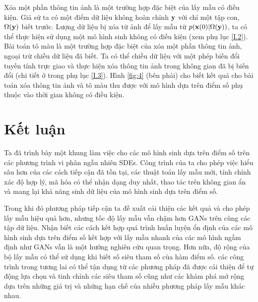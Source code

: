\documentclass{article} %
\begin{document}
Xóa một phần thông tin ảnh là một trường hợp đặc biệt của lấy mẫu có điều kiện.
Giả sử ta có một điểm dữ liệu không hoàn chỉnh $\bold{y}$ với chỉ một tập con, $\Omega(\bold{y})$ biết trước.
Lượng dữ liệu bị xóa từ ảnh để lấy mẫu từ $p(\bold{x}(0) \vert \Omega(\bold{y}))$, ta có thể thực hiện sử dụng một mô hình sinh không có điều kiện (xem phụ lục \ref{I.2}).
Bài toán tô màu là một trường hợp đặc biệt của xóa một phần thông tin ảnh, ngoại trừ chiều dữ liệu đã biết.
Ta có thể chiều dữ liệu với một phép biến đổi tuyến tính trực giao và thực hiện xóa thông tin ảnh trong không gian đã bị biến đổi (chi tiết ở trong phụ lục \ref{I.3}).
Hình \ref{fig:4} (bên phải) cho biết kết quả cho bài toán xóa thông tin ảnh và tô màu thu được với mô hình dựa trên điểm số phụ thuộc vào thời gian không có điều kiện.

\section{Kết luận}

Ta đã trình bày một khung làm việc cho các mô hình sinh dựa trên điểm số trên các phương trình vi phân ngẫu nhiên SDEs.
Công trình của ta cho phép việc hiểu sâu hơn của các cách tiếp cận đã tồn tại, các thuật toán lấy mẫu mới, tính chính xác độ hợp lý, mã hóa có thể nhận dạng duy nhất, thao tác trên không gian ẩn và mang lại khả năng sinh dữ liệu của mô hình sinh dựa trên điểm số.

Trong khi đó phương pháp tiếp cận ta đề xuất cải thiện các kết quả và cho phép lấy mẫu hiệu quả hơn, nhưng tốc độ lấy mẫu vẫn chậm hơn GANs \citep{goodfellow2020generative} trên cùng các tập dữ liệu.
Nhận biết các cách kết hợp quá trình huấn luyện ổn định của các mô hình sinh dựa trên điểm số kết hợp với lấy mẫu nhanh của các mô hình ngầm định như GANs vẫn là một hướng nghiên cứu quan trọng.
Hơn nữa, độ rộng của bộ lấy mẫu có thể sử dụng khi biết số siêu tham số của hàm điểm số.
các công trình trong tương lai có thể tận dụng từ các phương pháp đã được cải thiện để tự động lựa chọn và tinh chỉnh các siêu tham số cũng như các khám phá mở rộng dựa trên những giá trị và những hạn chế của nhiều phương pháp lấy mẫu khác nhau.
\newpage



\newpage

\appendix
\end{document}
